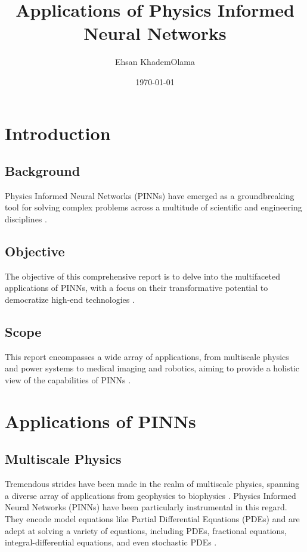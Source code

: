 \documentclass[12pt]{article}
\title{Applications of Physics Informed Neural Networks}
\author{Ehsan KhademOlama}
\date{\today}
\begin{document}
	
	\maketitle
	\tableofcontents
	
	\section{Introduction}
	\subsection{Background}
	Physics Informed Neural Networks (PINNs) have emerged as a groundbreaking tool for solving complex problems across a multitude of scientific and engineering disciplines \cite{nature-multiscale, springer-multiscale}.
	
	\subsection{Objective}
	The objective of this comprehensive report is to delve into the multifaceted applications of PINNs, with a focus on their transformative potential to democratize high-end technologies \cite{sciencedirect-multiscale}.
	
	\subsection{Scope}
	This report encompasses a wide array of applications, from multiscale physics \cite{arxiv-multiscale} and power systems \cite{ieee-xplore1, ieee-xplore2} to medical imaging and robotics, aiming to provide a holistic view of the capabilities of PINNs \cite{ieee-xplore1}.
		
	\section{Applications of PINNs}
	\subsection{Multiscale Physics}
	Tremendous strides have been made in the realm of multiscale physics, spanning a diverse array of applications from geophysics to biophysics \cite{nature-reviews-physics}. Physics Informed Neural Networks (PINNs) have been particularly instrumental in this regard. They encode model equations like Partial Differential Equations (PDEs) and are adept at solving a variety of equations, including PDEs, fractional equations, integral-differential equations, and even stochastic PDEs \cite{springer-pde}.
	
\end{document}
